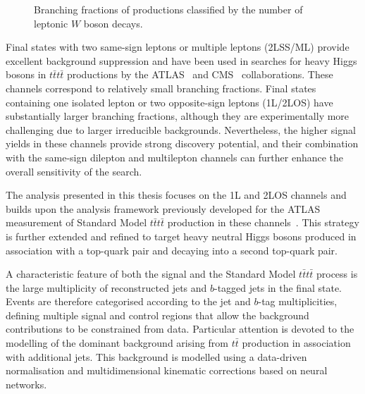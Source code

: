 \begin{figure}[htbp]
\centering
{}
\caption{Branching fractions of \ttttsym{} productions classified by the number of leptonic $W$ boson decays.}
\label{fig:tttt_br}
\end{figure}

Final states with two same-sign leptons or multiple leptons (2LSS/ML) provide
excellent background suppression and have been used in searches for
heavy Higgs bosons in $t\bar{t}t\bar{t}$ productions by the ATLAS~\cite{2023_SSML_4top} and CMS~\cite{CMS-TOP-18-003}
collaborations. These channels correspond to relatively
small branching fractions. Final states containing one isolated lepton
or two opposite-sign leptons (1L/2LOS) have substantially larger branching
fractions, although they are experimentally more challenging due to
larger irreducible backgrounds. Nevertheless, the higher signal yields
in these channels provide strong discovery potential, and their
combination with the same-sign dilepton and multilepton channels can
further enhance the overall sensitivity of the search.

The analysis presented in this thesis focuses on the 1L and 2LOS
channels and builds upon the analysis framework previously developed
for the ATLAS measurement of Standard Model $t\bar{t}t\bar{t}$ production in these channels~\cite{ATLAS:2021kqb}. 
This strategy is further extended and refined to target heavy
neutral Higgs bosons produced in association with a top-quark pair
and decaying into a second top-quark pair.

A characteristic feature of both the signal and the Standard Model
$t\bar{t}t\bar{t}$ process is the large multiplicity of reconstructed jets and
$b$-tagged jets in the final state. Events are therefore categorised
according to the jet and $b$-tag multiplicities, defining multiple
signal and control regions that allow the background contributions to
be constrained from data.
Particular attention is devoted to the modelling of the dominant
background arising from $t\bar{t}$ production in association with
additional jets. This background is modelled using a data-driven normalisation and
multidimensional kinematic corrections based on neural networks.

